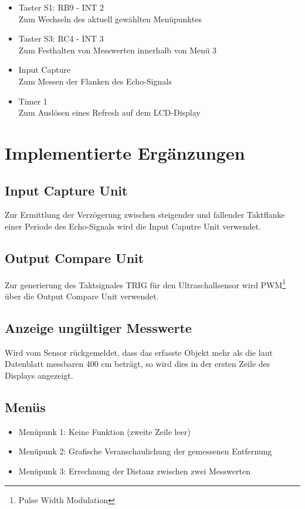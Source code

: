 \documentclass[german]{article}
\begin{document}
\begin{itemize}
    \item Taster S1: RB9 - INT 2    \\ Zum Wechseln des aktuell gewählten Menüpunktes
    \item Taster S3: RC4 - INT 3    \\ Zum Festhalten von Messwerten innerhalb von Menü 3
    \item Input Capture             \\ Zum Messen der Flanken des Echo-Signals
    \item Timer 1                   \\ Zum Auslösen eines Refresh auf dem LCD-Display
\end{itemize}

\section{Implementierte Ergänzungen}

\subsection{Input Capture Unit}

Zur Ermittlung der Verzögerung zwischen steigender und fallender Taktflanke einer Periode des Echo-Signals wird die Input Caputre Unit verwendet.

\subsection{Output Compare Unit}

Zur generierung des Taktsignales TRIG für den Ultraschallsensor wird PWM\footnote{Pulse Width Modulation} über die Output Compare Unit verwendet.

\subsection{Anzeige ungültiger Messwerte}

Wird vom Sensor rückgemeldet, dass das erfasste Objekt mehr als die laut Datenblatt messbaren 400 cm beträgt, so wird dies in der ersten Zeile des Displays angezeigt.

\subsection{Menüs}

\begin{itemize}
\item Menüpunk 1: Keine Funktion (zweite Zeile leer)
\item Menüpunk 2: Grafische Veranschaulichung der gemessenen Entfernung
\item Menüpunk 3: Errechnung der Distanz zwischen zwei Messwerten
\end{itemize}
\end{document}
